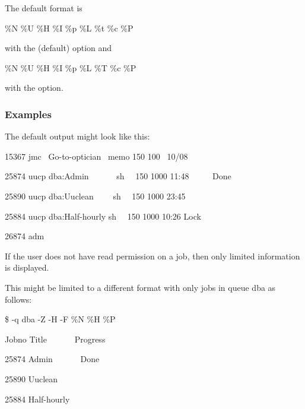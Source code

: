 The default format is

\begin{expara}

\%N \%U \%H \%I \%p \%L \%t \%c \%P

\end{expara}

with the (default)  option and

\begin{expara}

\%N \%U \%H \%I \%p \%L \%T \%c \%P

\end{expara}

with the  option.

\subsubsection{Examples}
The default output might look like this:

\begin{expara}

15367 jmc \ Go-to-optician \ memo 150 100 \ 10/08

25874 uucp dba:Admin \ \ \ \ \ \ sh \ \ 150 1000 11:48 \ \ \ \ \ Done

25890 uucp dba:Uuclean \ \ \ \ sh \ \ 150 1000 23:45

25884 uucp dba:Half-hourly sh \ \ 150 1000 10:26 Lock

26874 adm

\end{expara}

If the user does not have read permission on a job, then only limited information is displayed.

This might be limited to a different format with only jobs in queue dba as follows:

\begin{expara}

\$ \BtjlistName{} -q dba -Z -H -F {\textquotedbl}\%N \%H \%P{\textquotedbl}

Jobno Title \ \ \ \ \ \ Progress

25874 Admin \ \ \ \ \ \ Done

25890 Uuclean

25884 Half-hourly

\end{expara}

